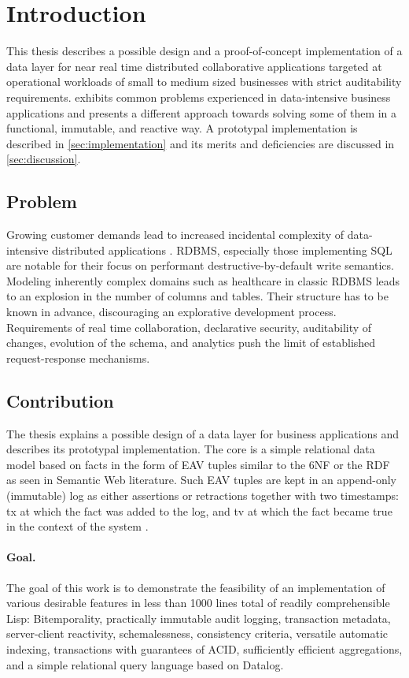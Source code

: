 \section{Introduction}

This thesis describes a possible design and a proof-of-concept implementation of a data layer for near real time distributed collaborative applications targeted at operational workloads of small to medium sized businesses with strict auditability requirements.  exhibits common problems experienced in data-intensive business applications and presents a different approach towards solving some of them in a functional, immutable, and reactive way. A prototypal implementation is described in \autoref{sec:implementation} and its merits and deficiencies are discussed in \autoref{sec:discussion}.

\subsection{Problem}
Growing customer demands lead to increased incidental complexity of data-intensive distributed applications \cite{kleppmann2017designing}. \gls{RDBMS}, especially those implementing \gls{SQL} are notable for their focus on performant destructive-by-default write semantics. Modeling inherently complex domains such as healthcare in classic RDBMS leads to an explosion in the number of columns and tables. Their structure has to be known in advance, discouraging an explorative development process. Requirements of real time collaboration, declarative security, auditability of changes, evolution of the schema, and analytics push the limit of established request-response mechanisms.


\subsection{Contribution}
The thesis explains a possible design of a data layer for business applications and describes its prototypal implementation. The core is a simple relational data model based on facts in the form of \gls{EAV} tuples similar to the \gls{6NF} or the \gls{RDF} as seen in Semantic Web literature. Such EAV tuples are kept in an append-only (immutable) log as either assertions or retractions together with two timestamps: \gls{tx} at which the fact was added to the log, and \gls{tv} at which the fact became true in the context of the system \cite{snodgrass1992temporal}.


\paragraph{Goal.}
The goal of this work is to demonstrate the feasibility of an implementation of various desirable features in less than 1000 lines total of readily comprehensible Lisp: Bitemporality, practically immutable audit logging, transaction metadata, server-client reactivity, schemalessness, consistency criteria, versatile automatic indexing, transactions with guarantees of \gls{ACID}, sufficiently efficient aggregations, and a simple relational query language based on Datalog.

